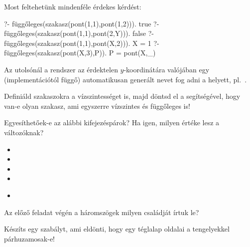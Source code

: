 Most feltehetünk mindenféle érdekes kérdést:
\begin{query}
?- függőleges(szakasz(pont(1,1),pont(1,2))).
true
?- függőleges(szakasz(pont(1,1),pont(2,Y))).
false
?- függőleges(szakasz(pont(1,1),pont(X,2))).
X = 1
?- függőleges(szakasz(pont(X,3),P)).
P = pont(X,_)
\end{query}
Az utolsónál a rendszer az érdektelen
$y$-koordinátára valójában egy (implementációtól
függő) automatikusan generált nevet fog adni a
\pr{\_} helyett, pl.~.

\begin{problem}
Definiáld szakaszokra a vízszintességet is, majd
döntsd el a segítségével, hogy van-e olyan szakasz,
ami egyszerre vízszintes és függőleges is!
\end{problem}
\begin{problem}
Egyesíthetőek-e az alábbi kifejezéspárok? Ha igen,
milyen értéke lesz a változóknak?
\begin{itemize}
\item {}
\item {}
\item {}
\item {}
\item {}\\
\end{itemize}
\end{problem}
\begin{problem}
Az előző feladat végén a háromszögek milyen
családját írtuk le?
\end{problem}
\begin{problem}
Készíts egy szabályt, ami eldönti, hogy egy téglalap
oldalai a tengelyekkel párhuzamosak-e!
\end{problem}

